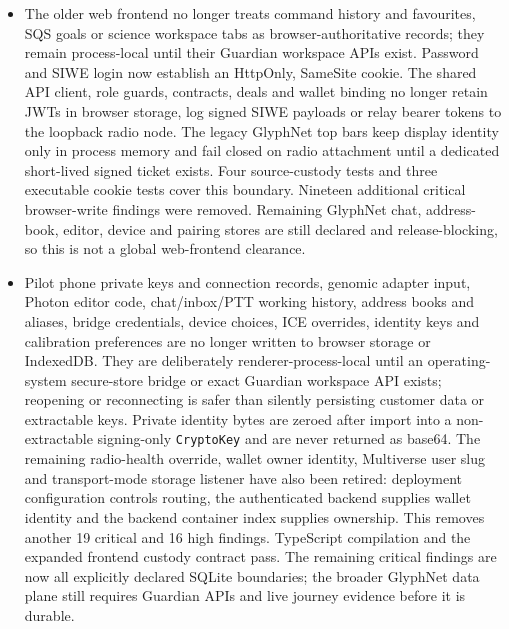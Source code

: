\documentclass[11pt]{article}
\newcommand{\code}[1]{\texttt{#1}}
\begin{document}
\begin{itemize}
  \item The older web frontend no longer treats command history and favourites, SQS goals or science workspace tabs as browser-authoritative records; they remain process-local until their Guardian workspace APIs exist. Password and SIWE login now establish an HttpOnly, SameSite cookie. The shared API client, role guards, contracts, deals and wallet binding no longer retain JWTs in browser storage, log signed SIWE payloads or relay bearer tokens to the loopback radio node. The legacy GlyphNet top bars keep display identity only in process memory and fail closed on radio attachment until a dedicated short-lived signed ticket exists. Four source-custody tests and three executable cookie tests cover this boundary. Nineteen additional critical browser-write findings were removed. Remaining GlyphNet chat, address-book, editor, device and pairing stores are still declared and release-blocking, so this is not a global web-frontend clearance.
  \item Pilot phone private keys and connection records, genomic adapter input, Photon editor code, chat/inbox/PTT working history, address books and aliases, bridge credentials, device choices, ICE overrides, identity keys and calibration preferences are no longer written to browser storage or IndexedDB. They are deliberately renderer-process-local until an operating-system secure-store bridge or exact Guardian workspace API exists; reopening or reconnecting is safer than silently persisting customer data or extractable keys. Private identity bytes are zeroed after import into a non-extractable signing-only \code{CryptoKey} and are never returned as base64. The remaining radio-health override, wallet owner identity, Multiverse user slug and transport-mode storage listener have also been retired: deployment configuration controls routing, the authenticated backend supplies wallet identity and the backend container index supplies ownership. This removes another 19 critical and 16 high findings. TypeScript compilation and the expanded frontend custody contract pass. The remaining critical findings are now all explicitly declared SQLite boundaries; the broader GlyphNet data plane still requires Guardian APIs and live journey evidence before it is durable.

\end{itemize}
\end{document}
